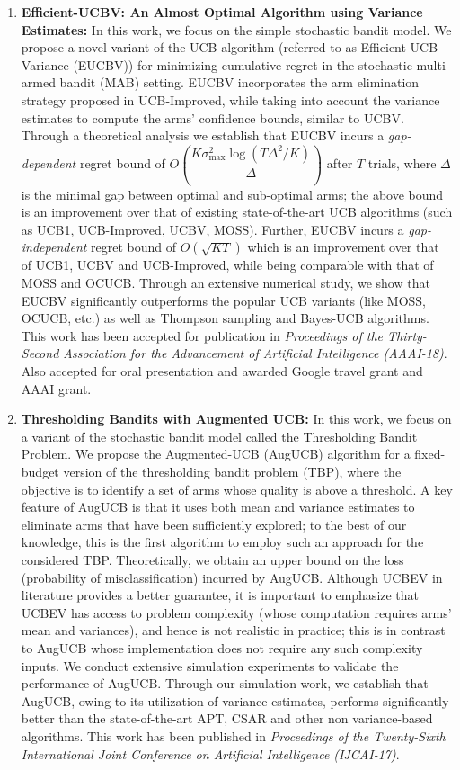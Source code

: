 \documentclass[twoside]{article}
\begin{document}
\begin{enumerate}
\item \textbf{Efficient-UCBV: An Almost Optimal Algorithm using Variance Estimates:} In this work, we focus on the simple stochastic bandit model. We propose a novel variant of the UCB algorithm (referred to as Efficient-UCB-Variance (EUCBV)) for minimizing cumulative regret in the stochastic multi-armed bandit (MAB) setting. EUCBV incorporates the arm elimination strategy proposed in UCB-Improved, while taking into account the variance estimates to compute the arms' confidence bounds, similar to UCBV. Through a theoretical analysis we establish that EUCBV incurs a \emph{gap-dependent} regret bound of  $O\left( \dfrac{K\sigma^2_{\max} \log (T\Delta^2 /K)}{\Delta}\right)$ after $T$ trials, where $\Delta$ is the minimal gap between optimal and sub-optimal arms; the above bound is an improvement over that of existing state-of-the-art UCB algorithms (such as UCB1, UCB-Improved, UCBV,  MOSS). Further, EUCBV incurs a \emph{gap-independent} regret bound of {$O\left(\sqrt{KT}\right)$}  which is an improvement over that of UCB1, UCBV and UCB-Improved, while being comparable with that of MOSS and OCUCB. Through an extensive numerical study, we show that EUCBV significantly outperforms the popular UCB variants (like MOSS, OCUCB, etc.) as well as Thompson sampling and Bayes-UCB algorithms. This work has been accepted for publication in \textit{Proceedings of the Thirty-Second Association for the Advancement of Artificial Intelligence (AAAI-18)}. Also accepted for oral presentation and awarded Google travel grant and AAAI grant.

\item \textbf{Thresholding Bandits with Augmented UCB:} In this work, we focus on a variant of the stochastic bandit model called the Thresholding Bandit Problem. We propose the Augmented-UCB (AugUCB) algorithm for a fixed-budget version of the thresholding bandit problem (TBP), where the objective is to identify a set of arms whose quality is above a threshold. A key feature of AugUCB is that it uses both mean and variance estimates to eliminate arms that have been sufficiently explored; to the best of our knowledge, this is the first algorithm to employ such an approach for the considered TBP.  Theoretically, we obtain an upper bound on the loss (probability of misclassification) incurred by AugUCB. Although UCBEV in literature provides a better guarantee, it is important to emphasize that UCBEV has access to problem complexity (whose computation requires arms' mean and variances), and hence is not realistic in practice; this is in contrast to AugUCB whose implementation does not require any such complexity inputs. We conduct extensive simulation experiments to validate the performance of AugUCB. Through our simulation work, we establish that AugUCB, owing to its utilization of variance estimates, performs significantly better than the state-of-the-art APT, CSAR and other non variance-based algorithms. This work has been published in \textit{Proceedings of the Twenty-Sixth International Joint Conference on Artificial Intelligence (IJCAI-17)}.
\end{enumerate}
\end{document}
